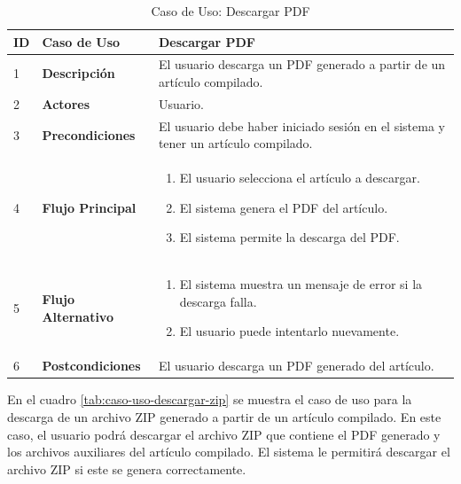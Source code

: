 \begin{table}[H]
    \centering
    \begin{tabular}{|p{0.5cm}|p{3.5cm}|p{10cm}|}
        \hline
        \textbf{ID} & \textbf{Caso de Uso} & \textbf{Descargar PDF} \\
        \hline
        1 & \textbf{Descripción} & El usuario descarga un PDF generado a partir de un artículo compilado. \\
        \hline
        2 & \textbf{Actores} & Usuario. \\
        \hline
        3 & \textbf{Precondiciones} & El usuario debe haber iniciado sesión en el sistema y tener un artículo compilado. \\
        \hline
        4 & \textbf{Flujo Principal} & 
        \begin{enumerate}
            \item El usuario selecciona el artículo a descargar.
            \item El sistema genera el PDF del artículo.
            \item El sistema permite la descarga del PDF.
        \end{enumerate} \\
        \hline
        5 & \textbf{Flujo Alternativo} & 
        \begin{enumerate}
            \item El sistema muestra un mensaje de error si la descarga falla.
            \item El usuario puede intentarlo nuevamente.
        \end{enumerate} \\
        \hline
        6 & \textbf{Postcondiciones} & El usuario descarga un PDF generado del artículo. \\
        \hline
    \end{tabular}
    \caption{Caso de Uso: Descargar PDF}
    \label{tab:caso-uso-descargar-pdf}

\end{table}

En el cuadro \ref{tab:caso-uso-descargar-zip} se muestra el caso de uso para la descarga de un archivo ZIP generado a partir de un artículo compilado. En este caso, el usuario podrá descargar el archivo ZIP que contiene el PDF generado y los archivos auxiliares del artículo compilado. El sistema le permitirá descargar el archivo ZIP si este se genera correctamente.

